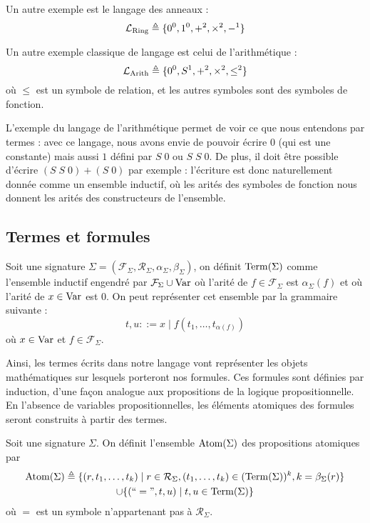 \begin{example}
  Un autre exemple est le langage des anneaux :
  \[\mathcal L_{\mathrm{Ring}}\triangleq \{0^0,1^0,+^2,\times^2,-^1\}\]
\end{example}

\begin{example}
  Un autre exemple classique de langage est celui de l'arithmétique :
  \[\mathcal L_{\mathrm{Arith}}\triangleq \{0^0, S^1, +^2,\times^2,\leq^2\}\]
  où $\leq$ est un symbole de relation, et les autres symboles sont des symboles
  de fonction.
\end{example}

L'exemple du langage de l'arithmétique permet de voir ce que nous entendons par
termes : avec ce langage, nous avons envie de pouvoir écrire $0$ (qui est une
constante) mais aussi $1$ défini par $S\;0$ ou $S\;S\;0$. De plus, il doit être
possible d'écrire $(S\;S\;0) + (S\;0)$ par exemple : l'écriture est donc
naturellement donnée comme un ensemble inductif, où les arités des symboles de
fonction nous donnent les arités des constructeurs de l'ensemble.

\subsection{Termes et formules}

\begin{definition}[Termes]
  Soit une signature
  $\Sigma = (\mathcal F_\Sigma,\mathcal R_\Sigma, \alpha_\Sigma,\beta_\Sigma)$,
  on définit $\operatorname{Term}(\Sigma)$ comme l'ensemble inductif engendré par
  $\mathcal F_\Sigma\cup\operatorname{Var}$ où l'arité de $f\in\mathcal F_\Sigma$ est
  $\alpha_\Sigma(f)$ et où l'arité de $x\in \operatorname{Var}$ est $0$. On peut représenter
  cet ensemble par la grammaire suivante :
  \[t,u ::= x \mid f(t_1,\ldots,t_{\alpha(f)})\]
  où $x\in \operatorname{Var}$ et $f\in \mathcal F_\Sigma$.
\end{definition}

Ainsi, les termes écrits dans notre langage vont représenter les objets
mathématiques sur lesquels porteront nos formules. Ces formules sont définies par
induction, d'une façon analogue aux propositions de la logique propositionnelle.
En l'absence de variables propositionnelles, les éléments atomiques des formules
seront construits à partir des termes.

\begin{definition}
  Soit une signature $\Sigma$. On définit l'ensemble $\operatorname{Atom}(\Sigma)$ des
  propositions atomiques par
  \begin{multline*}
    \operatorname{Atom}(\Sigma) \triangleq \{(r,t_1,\ldots,t_k)\mid r\in\mathcal R_\Sigma,
    (t_1,\ldots,t_k) \in (\operatorname{Term}(\Sigma))^k, k = \beta_\Sigma(r)\}\\
    \cup\{(``=",t,u)\mid t,u\in \operatorname{Term}(\Sigma)\}
  \end{multline*}
  où $=$ est un symbole n'appartenant pas à $\mathcal R_\Sigma$.
\end{definition}

